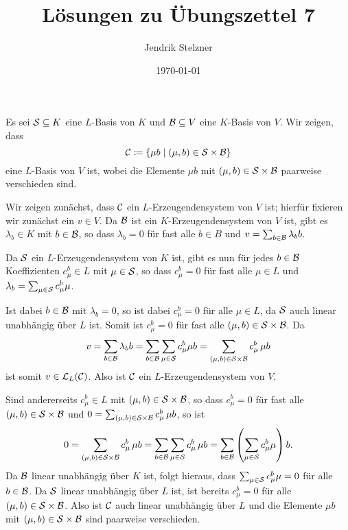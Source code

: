 \documentclass[a4paper,10pt]{scrartcl}
\title{Lösungen zu Übungszettel 7}
\author{Jendrik Stelzner}
\date{\today}
\begin{document}
\maketitle









\addtocounter{section}{1}










\section{}
Es sei $\mathcal{S} \subseteq K$ eine $L$-Basis von $K$ und $\mathcal{B} \subseteq V$ eine $K$-Basis von $V$. Wir zeigen, dass
\[
 \mathcal{C} \coloneqq \{\mu b \mid (\mu, b) \in \mathcal{S} \times \mathcal{B}\}
\]
eine $L$-Basis von $V$ ist, wobei die Elemente $\mu b$ mit $(\mu, b) \in \mathcal{S} \times \mathcal{B}$ paarweise verschieden sind.

Wir zeigen zunächst, dass $\mathcal{C}$ ein $L$-Erzeugendensystem von $V$ ist; hierfür fixieren wir zunächst ein $v \in V$. Da $\mathcal{B}$ ist ein $K$-Erzeugendensystem von $V$ ist, gibt es $\lambda_b \in K$ mit $b \in \mathcal{B}$, so dass $\lambda_b = 0$ für fast alle $b \in B$ und $v = \sum_{b \in \mathcal{B}} \lambda_b b$.

Da $\mathcal{S}$ ein $L$-Erzeugendensystem von $K$ ist, gibt es nun für jedes $b \in \mathcal{B}$ Koeffizienten $c^b_\mu \in L$ mit $\mu \in \mathcal{S}$, so dass $c^b_\mu = 0$ für fast alle $\mu \in L$ und $\lambda_b = \sum_{\mu \in \mathcal{S}} c^b_\mu \mu$.

Ist dabei $b \in \mathcal{B}$ mit $\lambda_b = 0$, so ist dabei $c^b_\mu = 0$ für alle $\mu \in L$, da $\mathcal{S}$ auch linear unabhängig über $L$ ist. Somit ist $c^b_\mu = 0$ für fast alle $(\mu,b) \in  \mathcal{S} \times \mathcal{B}$. Da
\[
 v
 = \sum_{b \in \mathcal{B}} \lambda_b b
 = \sum_{b \in \mathcal{B}} \sum_{\mu \in \mathcal{S}} c^b_\mu \mu b
 = \sum_{(\mu,b) \in \mathcal{S} \times \mathcal{B}} c^b_\mu \, \mu b
\]
ist somit $v \in \mathcal{L}_L(\mathcal{C})$. Also ist $\mathcal{C}$ ein $L$-Erzeugendensystem von $V$.

Sind andererseits $c^b_\mu \in L$ mit $(\mu,b) \in \mathcal{S} \times \mathcal{B}$, so dass $c^b_\mu = 0$ für fast alle $(\mu,b) \in \mathcal{S} \times \mathcal{B}$ und $0 = \sum_{(\mu,b) \in \mathcal{S} \times \mathcal{B}} c^b_\mu \, \mu b$, so ist
\[
 0
 = \sum_{(\mu,b) \in \mathcal{S} \times \mathcal{B}} c^b_\mu \, \mu b
 = \sum_{b \in \mathcal{B}} \sum_{\mu \in \mathcal{S}} c^b_\mu \, \mu b
 = \sum_{b \in \mathcal{B}} \left( \sum_{\mu \in \mathcal{S}} c^b_\mu \mu \right) b.
\]
Da $\mathcal{B}$ linear unabhängig über $K$ ist, folgt hieraus, dass $\sum_{\mu \in \mathcal{S}} c^b_\mu \mu = 0$ für alle $b \in \mathcal{B}$. Da $\mathcal{S}$ linear unabhängig über $L$ ist, ist bereits $c^b_\mu = 0$ für alle $(\mu,b) \in \mathcal{S} \times \mathcal{B}$. Also ist $\mathcal{C}$ auch linear unabhängig über $L$ und die Elemente $\mu b$ mit $(\mu,b) \in \mathcal{S} \times \mathcal{B}$ sind paarweise verschieden.
\end{document}
